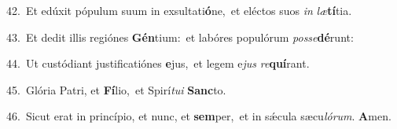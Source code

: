 {\numbfont\textcolor{\numbcolor}{42.}}~Et edúxit pópulum suum in exsultati\-\textbf{ó}\-ne,~\star et eléctos suos \textit{in} \textit{læ}\-\textbf{tí}tia.\par
{\numbfont\textcolor{\numbcolor}{43.}}~Et dedit illis regiónes \textbf{Gén}\-tium:~\star et labóres populórum \textit{pos}\-\textit{se}\textbf{dé}runt:\par
{\numbfont\textcolor{\numbcolor}{44.}}~Ut custódiant justificatiónes \textbf{e}\-jus,~\star et legem e\textit{jus} \textit{re}\-\textbf{quí}rant.\par
{\numbfont\textcolor{\numbcolor}{45.}}~Glória Patri, et \textbf{Fí}\-lio,~\star et Spirí\-\textit{tu}\-\textit{i} \textbf{Sanc}\-to.\par
{\numbfont\textcolor{\numbcolor}{46.}}~Sicut erat in princípio, et nunc, et \textbf{sem}\-per,~\star et in sǽcula sæcu\-\textit{ló}\-\textit{rum}. \textbf{A}\-men.\par
